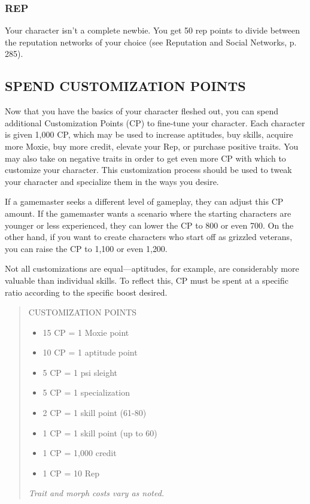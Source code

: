 \subsubsection{REP}
Your character isn’t a complete newbie. You get 50 rep points to divide between
the reputation networks of your choice (see Reputation and Social Networks,
p. 285).

\subsection{SPEND CUSTOMIZATION POINTS} %
Now that you have the basics of your character fleshed out, you can spend
additional Customization Points (CP) to fine-tune your character. Each
character is given 1,000 CP, which may be used to increase aptitudes, buy
skills, acquire more Moxie, buy more credit, elevate your Rep, or purchase
positive traits. You may also take on negative traits in order to get even
more CP with which to customize your character. This customization process
should be used to tweak your character and specialize them in the ways you
desire.

If a gamemaster seeks a different level of gameplay, they can adjust this CP
amount. If the gamemaster wants a scenario where the starting characters are
younger or less experienced, they can lower the CP to 800 or even 700. On the
other hand, if you want to create characters who start off as grizzled
veterans, you can raise the CP to 1,100 or even 1,200.

Not all customizations are equal—aptitudes, for example, are considerably
more valuable than individual skills. To reflect this, CP must be spent at a
specific ratio according to the specific boost desired.

\begin{quotation}
  CUSTOMIZATION POINTS
  \begin{itemize}
  \item 15 CP = 1 Moxie point
  \item 10 CP = 1 aptitude point
  \item 5 CP = 1 psi sleight
  \item 5 CP = 1 specialization
  \item 2 CP = 1 skill point (61-80)
  \item 1 CP = 1 skill point (up to 60)
  \item 1 CP = 1,000 credit
  \item 1 CP = 10 Rep
\end{itemize}
\textit{Trait and morph costs vary as noted.}
\end{quotation}


